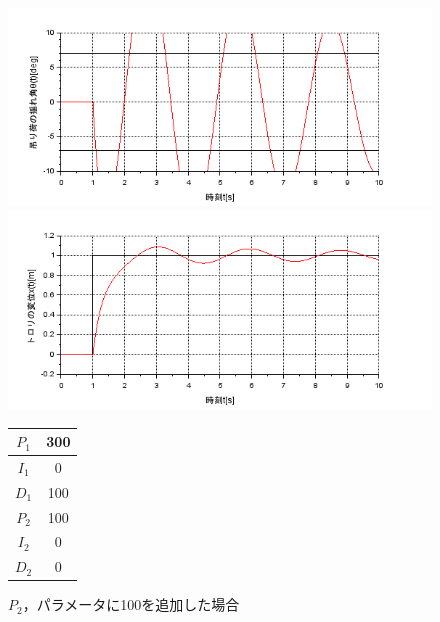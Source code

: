 \documentclass[dvipdfmx,titlepage,a4j]{jsarticle}  %
\begin{document}
\begin{figure}[H]
  \begin{minipage}{4.5cm}
    \centering
    \includegraphics[keepaspectratio, scale=0.35]{../graph/crane/ang-P1-300-I1-0-D1-100-P2-100-I2-0-D2-0.png}
  \end{minipage}
  \hfill
  \begin{minipage}{4.5cm}
    \centering
    \includegraphics[keepaspectratio, scale=0.35]{../graph/crane/po-P1-300-I1-0-D1-100-P2-100-I2-0-D2-0.png}
  \end{minipage}
  \hfill
  \begin{minipage}{3cm}
    \begin{center}
      \begin{tabular}{c|c}
        \hline
        $P_1$ & 300 \\ \hline
        $I_1$ & 0   \\ \hline
        $D_1$ & 100 \\ \hline
        $P_2$ & 100 \\ \hline
        $I_2$ & 0   \\ \hline
        $D_2$ & 0   \\
        \hline
      \end{tabular}
    \end{center}
  \end{minipage}
  \hfill
  \caption{$P_2$，パラメータに100を追加した場合}
  \label{fig:crane:7}
\end{figure}
\end{document}
